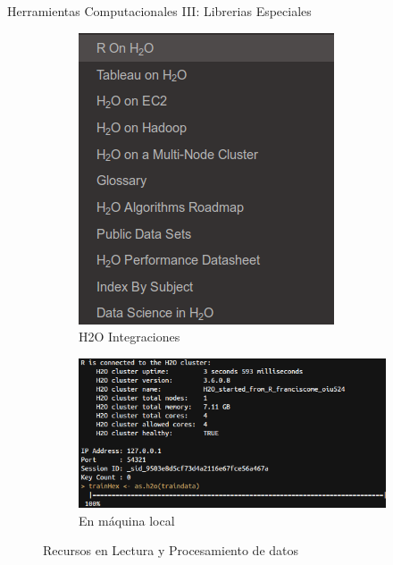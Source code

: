 \documentclass{bredelebeamer}
\begin{document}

\begin{frame}{Herramientas Computacionales III: Librerias Especiales}

\begin{figure}
\centering
\begin{subfigure}{.5\textwidth}
  \centering
  \includegraphics[width=.75\linewidth]{images/H2OServices.png}
  \caption{H2O Integraciones}
\end{subfigure}%
\begin{subfigure}{.5\textwidth}
  \centering
  \includegraphics[width=1.1\linewidth]{images/H2OServices2.png}
  \caption{En m\'aquina local}
\end{subfigure}

\vspace{.75cm}

\caption{Recursos en Lectura y Procesamiento de datos}
\end{figure}

\end{frame}
\end{document}
